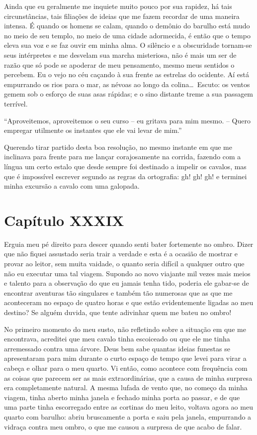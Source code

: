  Ainda que eu geralmente me inquiete muito pouco por sua rapidez, há
tais circunstâncias, tais filiações de ideias que me fazem recordar de
uma maneira intensa. É quando os homens se calam, quando o demônio do
barulho está mudo no meio de seu templo, no meio de uma cidade
adormecida, é então que o tempo eleva sua voz e se faz ouvir em minha
alma. O silêncio e a obscuridade tornam-se seus intérpretes e me
desvelam sua marcha misteriosa, não é mais um ser de razão que só pode
se apoderar de meu pensamento, mesmo meus sentidos o percebem. Eu o
vejo no céu caçando à sua frente as estrelas do ocidente. Aí está
empurrando os rios para o mar, as névoas ao longo da colina\ldots\ Escuto:
os ventos gemem sob o esforço de suas asas rápidas; e o sino distante
treme a sua passagem terrível.

 ``Aproveitemos, aproveitemos o seu curso -- eu gritava para mim mesmo. --
Quero empregar utilmente os instantes que ele vai levar de mim.''

 Querendo tirar partido desta boa resolução, no mesmo instante em que me
inclinava para frente para me lançar corajosamente na corrida, fazendo
com a língua um certo estalo que desde sempre foi destinado a impelir
os cavalos, mas que é impossível escrever segundo as regras da
ortografia: gh!     gh!     gh!
e terminei minha excursão a cavalo com uma galopada.

\section*{Capítulo XXXIX}

 Erguia meu pé direito para descer quando senti bater fortemente no
ombro. Dizer que não fiquei assustado seria trair a verdade e esta é a
ocasião de mostrar e provar ao leitor, sem muita vaidade, o quanto
seria difícil a qualquer outro que não eu executar uma tal viagem.
Supondo ao novo viajante mil vezes mais meios e talento para a
observação do que eu jamais tenha tido, poderia ele gabar-se de encontrar
aventuras tão singulares e também tão numerosas que as que me
aconteceram no espaço de quatro horas e que estão evidentemente ligadas
ao meu destino? Se alguém duvida, que tente adivinhar quem me bateu no
ombro!

 No primeiro momento do meu susto, não refletindo sobre a situação em
que me encontrava, acreditei que meu cavalo tinha escoiceado ou que ele
me tinha arremessado contra uma árvore. Deus bem sabe quantas ideias
funestas se apresentaram para mim durante o curto espaço de tempo que
levei para virar a cabeça e olhar para o meu quarto. Vi então, como
acontece com frequência com as coisas que parecem ser as mais
extraordinárias, que a causa de minha surpresa era completamente
natural. A mesma lufada de vento que, no começo da minha viagem, tinha
aberto minha janela e fechado minha porta ao passar, e de que uma parte
tinha escorregado entre as cortinas do meu leito, voltava agora ao meu
quarto com barulho: abriu bruscamente a porta e saiu pela janela,
empurrando a vidraça contra meu ombro, o que me causou a surpresa de
que acabo de falar.

